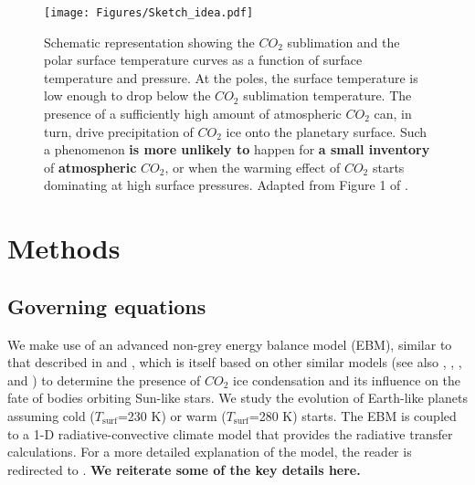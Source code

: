 \documentclass[fleqn,usenatbib]{mnras}
\providecommand{\DIFadd}[1]{{\bf #1}} %
\providecommand{\DIFdel}[1]{} %
\providecommand{\DIFaddbegin}{} %
\providecommand{\DIFaddend}{} %
\providecommand{\DIFaddFL}[1]{\DIFadd{#1}} %
\providecommand{\DIFdelFL}[1]{\DIFdel{#1}} %
\providecommand{\DIFaddbeginFL}{} %
\providecommand{\DIFaddendFL}{} %
\providecommand{\DIFdelbeginFL}{} %
\providecommand{\DIFdelendFL}{} %
\newcommand{\DIFscaledelfig}{0.5}
\newlength{\DIFdelgraphicswidth} %
\newlength{\DIFdelgraphicsheight} %
\newcommand{\DIFaddincludegraphics}[2][]{{\color{blue}\fbox{\DIFOincludegraphics[#1]{#2}}}} %
\newcommand{\DIFdelincludegraphics}[2][]{%
\sbox{\DIFdelgraphicsbox}{\DIFOincludegraphics[#1]{#2}}%
\settoboxwidth{\DIFdelgraphicswidth}{\DIFdelgraphicsbox} %
\settoboxtotalheight{\DIFdelgraphicsheight}{\DIFdelgraphicsbox} %
\scalebox{\DIFscaledelfig}{%
\parbox[b]{\DIFdelgraphicswidth}{\usebox{\DIFdelgraphicsbox}\\[-\baselineskip] \rule{\DIFdelgraphicswidth}{0em}}\llap{\resizebox{\DIFdelgraphicswidth}{\DIFdelgraphicsheight}{%
\setlength{\unitlength}{\DIFdelgraphicswidth}%
\begin{picture}(1,1)%
\thicklines\linethickness{2pt} %
{\color[rgb]{1,0,0}\put(0,0){\framebox(1,1){}}}%
{\color[rgb]{1,0,0}\put(0,0){\line( 1,1){1}}}%
{\color[rgb]{1,0,0}\put(0,1){\line(1,-1){1}}}%
\end{picture}%
}\hspace*{3pt}}} %
} %
\DeclareRobustCommand{\DIFaddbegin}{\DIFOaddbegin \let\includegraphics\DIFaddincludegraphics} %
\DeclareRobustCommand{\DIFaddend}{\DIFOaddend \let\includegraphics\DIFOincludegraphics} %
\DeclareRobustCommand{\DIFaddbeginFL}{\DIFOaddbeginFL \let\includegraphics\DIFaddincludegraphics} %
\DeclareRobustCommand{\DIFaddendFL}{\DIFOaddendFL \let\includegraphics\DIFOincludegraphics} %
\DeclareRobustCommand{\DIFdelbeginFL}{\DIFOdelbeginFL \let\includegraphics\DIFdelincludegraphics} %
\DeclareRobustCommand{\DIFdelendFL}{\DIFOaddendFL \let\includegraphics\DIFOincludegraphics} %
\begin{document}
\begin{figure}
	\texttt{[image: Figures/Sketch\_idea.pdf]}
    \caption{Schematic representation showing the $CO_{\mathrm{2}}$ sublimation and the polar surface temperature curves as a function of surface temperature and pressure. At the poles, the surface temperature is low enough to drop below the $CO_{\mathrm{2}}$ sublimation temperature. The presence of a sufficiently high amount of atmospheric $CO_{\mathrm{2}}$ can, in turn, drive precipitation of $CO_{\mathrm{2}}$ ice onto the planetary surface. 
    Such a phenomenon \DIFdelbeginFL \DIFdelFL{does not }\DIFdelendFL \DIFaddbeginFL \DIFaddFL{is more unlikely to }\DIFaddendFL happen for \DIFdelbeginFL \DIFdelFL{low contents }\DIFdelendFL \DIFaddbeginFL \DIFaddFL{a small inventory }\DIFaddendFL of \DIFaddbeginFL \DIFaddFL{atmospheric }\DIFaddendFL $CO_{\mathrm{2}}$, or when the warming effect of $CO_{\mathrm{2}}$ starts dominating at high surface pressures. Adapted from Figure 1 of \citet{Soto2015}.}
    \label{fig:Sketch}
\end{figure}

\section{Methods}
\DIFaddbegin \label{sec:Methods}
\DIFaddend \subsection{Governing equations}
We make use of an advanced non-grey energy balance model (EBM), similar to that described in \citet{RamirezLevi2018} and \cite{ramirez2020}, which is itself based on  other similar models (see also \citet{North1979},  \citet{North1981}, \citet{Williams1997}, and \citet{vladilo2013}) to determine the presence of $CO_{\mathrm{2}}$ ice condensation and its influence on the fate of bodies orbiting Sun-like stars. We study the evolution of Earth-like planets assuming cold ($T_{\mathrm{surf}}$=230 K) or warm ($T_{\mathrm{surf}}$=280 K) starts. The EBM is coupled to a 1-D radiative-convective climate model that provides the radiative transfer calculations. For a more detailed explanation of the model, the reader is redirected to \citet{ramirez2020}. \DIFaddbegin \DIFadd{We reiterate some of the key details here.
}\DIFaddend 
\end{document}
